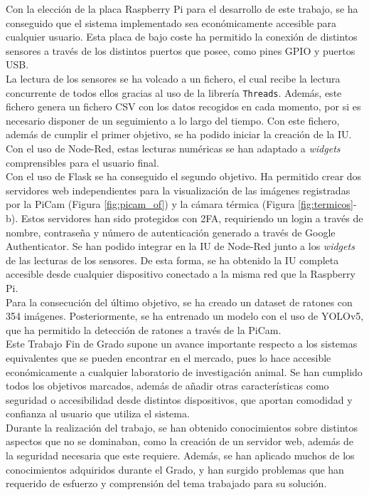Con la elección de la placa Raspberry Pi para el desarrollo de este trabajo, se ha conseguido que el sistema implementado sea económicamente accesible para cualquier usuario. Esta placa de bajo coste ha permitido la conexión de distintos sensores a través de los distintos puertos que posee, como pines GPIO y puertos USB.\\

La lectura de los sensores se ha volcado a un fichero, el cual recibe la lectura concurrente de todos ellos gracias al uso de la librería \verb|Threads|. Además, este fichero genera un fichero CSV con los datos recogidos en cada momento, por si es necesario disponer de un seguimiento a lo largo del tiempo. Con este fichero, además de cumplir el primer objetivo, se ha podido iniciar la creación de la IU. Con el uso de Node-Red, estas lecturas numéricas se han adaptado a \textit{widgets} comprensibles para el usuario final.\\

Con el uso de Flask se ha conseguido el segundo objetivo. Ha permitido crear dos servidores web independientes para la visualización de las imágenes registradas por la PiCam (Figura \ref{fig:picam_of}) y la cámara térmica (Figura \ref{fig:termicos}-b). Estos servidores han sido protegidos con 2FA, requiriendo un login a través de nombre, contraseña y número de autenticación generado a través de Google Authenticator. Se han podido integrar en la IU de Node-Red junto a los \textit{widgets} de las lecturas de los sensores. De esta forma, se ha obtenido la IU completa accesible desde cualquier dispositivo conectado a la misma red que la Raspberry Pi.\\

Para la consecución del último objetivo, se ha creado un dataset de ratones con 354 imágenes. Posteriormente, se ha entrenado un modelo con el uso de YOLOv5, que ha permitido la detección de ratones a través de la PiCam.\\

Este Trabajo Fin de Grado supone un avance importante respecto a los sistemas equivalentes que se pueden encontrar en el mercado, pues lo hace accesible económicamente a cualquier laboratorio de investigación animal. Se han cumplido todos los objetivos marcados, además de añadir otras características como seguridad o accesibilidad desde distintos dispositivos, que aportan comodidad y confianza al usuario que utiliza el sistema.\\

Durante la realización del trabajo, se han obtenido conocimientos sobre distintos aspectos que no se dominaban, como la creación de un servidor web, además de la seguridad necesaria que este requiere. Además, se han aplicado muchos de los conocimientos adquiridos durante el Grado, y han surgido problemas que han requerido de esfuerzo y comprensión del tema trabajado para su solución.\\

